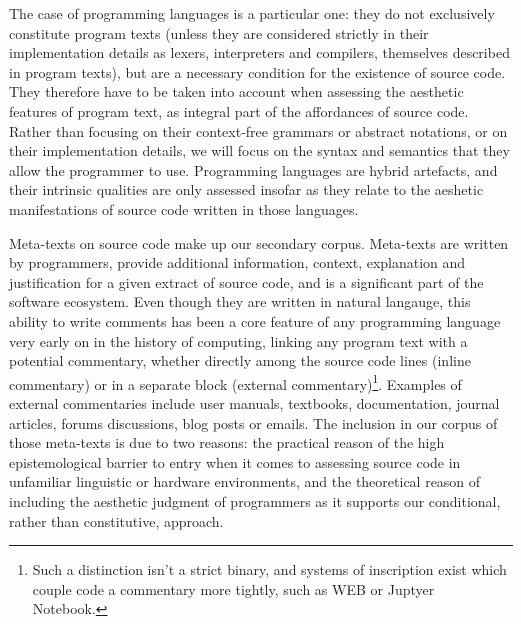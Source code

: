 The case of programming languages is a particular one: they do not exclusively constitute program texts (unless they are considered strictly in their implementation details as lexers, interpreters and compilers, themselves described in program texts), but are a necessary condition for the existence of source code. They therefore have to be taken into account when assessing the aesthetic features of program text, as integral part of the affordances of source code. Rather than focusing on their context-free grammars or abstract notations, or on their implementation details, we will focus on the syntax and semantics that they allow the programmer to use. Programming languages are hybrid artefacts, and their intrinsic qualities are only assessed insofar as they relate to the aeshetic manifestations of source code written in those languages.

Meta-texts on source code make up our secondary corpus. Meta-texts are written by programmers, provide additional information, context, explanation and justification for a given extract of source code, and is a significant part of the software ecosystem. Even though they are written in natural langauge, this ability to write comments has been a core feature of any programming language very early on in the history of computing, linking any program text with a potential commentary, whether directly among the source code lines (inline commentary) or in a separate block (external commentary)\footnote{Such a distinction isn't a strict binary, and systems of inscription exist which couple code a commentary more tightly, such as WEB or Juptyer Notebook.}. Examples of external commentaries include user manuals, textbooks, documentation, journal articles, forums discussions, blog posts or emails. The inclusion in our corpus of those meta-texts is due to two reasons: the practical reason of the high epistemological barrier to entry when it comes to assessing source code in unfamiliar linguistic or hardware environments, and the theoretical reason of including the aesthetic judgment of programmers as it supports our conditional, rather than constitutive, approach.


